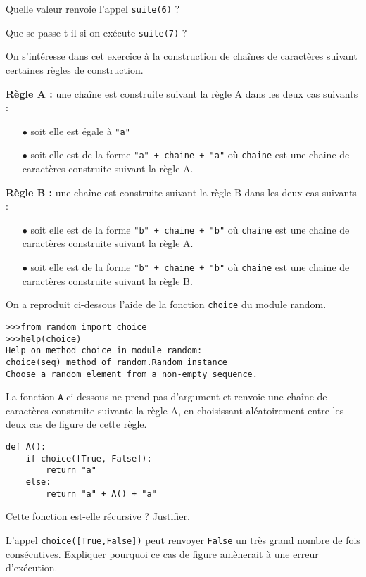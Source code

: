\documentclass[11pt,a4paper]{article}
\begin{document}
\SQListe
    \item Quelle valeur renvoie l'appel {\tt suite(6)} ?
    \item Que se passe-t-il si on exécute {\tt suite(7)} ?
\FinListe
\FinListe
\vspace{0.2cm}

On s'intéresse dans cet exercice à la construction de chaînes de caractères suivant certaines règles de construction.

\textbf{Règle A :} une chaîne est construite suivant la règle A dans les deux cas suivants :
\begin{itemize}
    \item[$\bullet$] soit elle est égale à {\tt "a"}
    \item[$\bullet$] soit elle est de la forme {\tt "a" + chaine + "a"} où {\tt chaine} est une chaine de caractères construite suivant la règle A.
\end{itemize}
\textbf{Règle B :} une chaîne est construite suivant la règle B dans les deux cas suivants :
\begin{itemize}
    \item[$\bullet$] soit elle est de la forme {\tt "b" + chaine + "b"} où {\tt chaine} est une chaine de caractères construite suivant la règle A.
    \item[$\bullet$] soit elle est de la forme {\tt "b" + chaine + "b"} où {\tt chaine} est une chaine de caractères construite suivant la règle B.
\end{itemize}
On a reproduit ci-dessous l'aide de la fonction {\tt choice} du module random.
\begin{lstlisting}
>>>from random import choice
>>>help(choice)
Help on method choice in module random:
choice(seq) method of random.Random instance
Choose a random element from a non-empty sequence.
\end{lstlisting}
La fonction {\tt A} ci dessous ne prend pas d'argument et renvoie une chaîne de caractères construite suivante la règle A, en choisissant aléatoirement entre les deux cas de figure de cette règle.
\begin{lstlisting}
def A():
    if choice([True, False]):
        return "a"
    else:
        return "a" + A() + "a"
\end{lstlisting}

\QListe
 \item 
 \SQListe
 \item Cette fonction est-elle récursive ? Justifier.
 \item L'appel {\tt choice([True,False])} peut renvoyer {\tt False} un très grand nombre de fois consécutives. Expliquer pourquoi ce cas de figure amènerait à une erreur d'exécution.
 \FinListe
\end{document}

